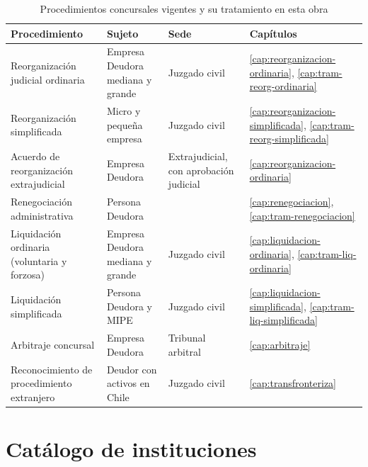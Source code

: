 \begin{table}[htbp]
\centering
\small
\caption{Procedimientos concursales vigentes y su tratamiento en esta obra}
\label{tab:catalogo-procedimientos}
\begin{tabularx}{\textwidth}{@{}>{\raggedright\arraybackslash}p{}
                                 >{\raggedright\arraybackslash}p{}
                                 X
                                 p{}@{}}
\toprule
\textbf{Procedimiento} & \textbf{Sujeto} & \textbf{Sede} & \textbf{Capítulos} \\
\midrule
Reorganización judicial ordinaria & Empresa Deudora mediana y grande & Juzgado civil
& \ref{cap:reorganizacion-ordinaria}, \ref{cap:tram-reorg-ordinaria} \\
\addlinespace
Reorganización simplificada & Micro y pequeña empresa & Juzgado civil
& \ref{cap:reorganizacion-simplificada}, \ref{cap:tram-reorg-simplificada} \\
\addlinespace
Acuerdo de reorganización extrajudicial & Empresa Deudora & Extrajudicial, con
aprobación judicial & \ref{cap:reorganizacion-ordinaria} \\
\addlinespace
Renegociación administrativa & Persona Deudora & \superir{}
& \ref{cap:renegociacion}, \ref{cap:tram-renegociacion} \\
\addlinespace
Liquidación ordinaria (voluntaria y forzosa) & Empresa Deudora mediana y grande
& Juzgado civil & \ref{cap:liquidacion-ordinaria}, \ref{cap:tram-liq-ordinaria} \\
\addlinespace
Liquidación simplificada & Persona Deudora y MIPE & Juzgado civil
& \ref{cap:liquidacion-simplificada}, \ref{cap:tram-liq-simplificada} \\
\addlinespace
Arbitraje concursal & Empresa Deudora & Tribunal arbitral & \ref{cap:arbitraje} \\
\addlinespace
Reconocimiento de procedimiento extranjero & Deudor con activos en Chile & Juzgado civil
& \ref{cap:transfronteriza} \\
\bottomrule
\end{tabularx}
\end{table}

\section{Catálogo de instituciones}

